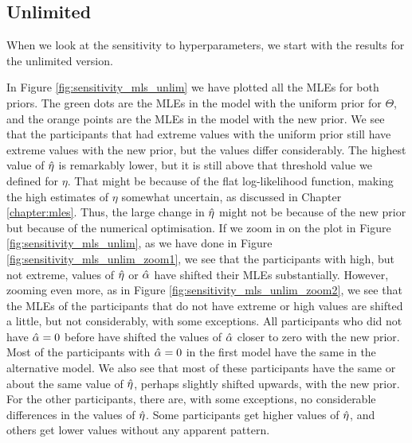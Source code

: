 \subsection{Unlimited}
When we look at the sensitivity to hyperparameters, we start with the results for the unlimited version.

In Figure \ref{fig:sensitivity_mls_unlim} we have plotted all the MLEs for both priors. The green dots are the MLEs in the model with the uniform prior for $\Theta$, and the orange points are the MLEs in the model with the new prior.
We see that the participants that had extreme values with the uniform prior still have extreme values with the new prior, but the values differ considerably. The highest value of $\hat{\eta}$ is remarkably lower, but it is still above that threshold value we defined for $\eta$. That might be because of the flat log-likelihood function, making the high estimates of $\eta$ somewhat uncertain, as discussed in Chapter \ref{chapter:mles}. Thus, the large change in $\hat{\eta}$ might not be because of the new prior but because of the numerical optimisation. 
If we zoom in on the plot in Figure \ref{fig:sensitivity_mls_unlim}, as we have done in Figure \ref{fig:sensitivity_mls_unlim_zoom1}, we see that the participants with high, but not extreme, values of $\hat{\eta}$ or $\hat{\alpha}$ have shifted their MLEs substantially. 
However, zooming even more, as in Figure \ref{fig:sensitivity_mls_unlim_zoom2}, we see that the MLEs of the participants that do not have extreme or high values are shifted a little, but not considerably, with some exceptions. All participants who did not have $\hat{\alpha}=0$ before have shifted the values of $\hat{\alpha}$ closer to zero with the new prior. 
Most of the participants with $\hat{\alpha}=0$ in the first model have the same in the alternative model. We also see that most of these participants have the same or about the same value of $\hat{\eta}$, perhaps slightly shifted upwards, with the new prior. For the other participants, there are, with some exceptions, no considerable differences in the values of $\hat{\eta}$. Some participants get higher values of $\hat{\eta}$, and others get lower values without any apparent pattern. 
